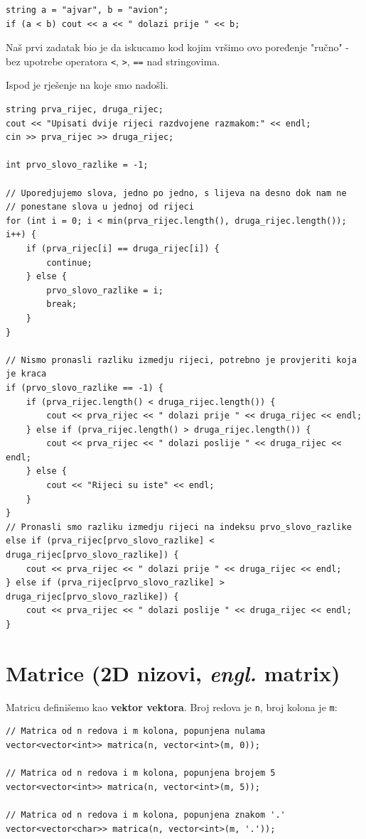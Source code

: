 \documentclass[11pt]{article}
\begin{document}
\begin{lstlisting}
string a = "ajvar", b = "avion";
if (a < b) cout << a << " dolazi prije " << b;
\end{lstlisting}

Naš prvi zadatak bio je da iskucamo kod kojim vršimo ovo poređenje "ručno" - bez upotrebe 
operatora \texttt{<}, \texttt{>}, \texttt{==} nad stringovima.

Ispod je rješenje na koje smo nadošli.

\begin{lstlisting}
string prva_rijec, druga_rijec;
cout << "Upisati dvije rijeci razdvojene razmakom:" << endl;
cin >> prva_rijec >> druga_rijec;

int prvo_slovo_razlike = -1;

// Uporedjujemo slova, jedno po jedno, s lijeva na desno dok nam ne 
// ponestane slova u jednoj od rijeci
for (int i = 0; i < min(prva_rijec.length(), druga_rijec.length()); i++) {
    if (prva_rijec[i] == druga_rijec[i]) {
        continue;
    } else {
        prvo_slovo_razlike = i;
        break;
    }
}

// Nismo pronasli razliku izmedju rijeci, potrebno je provjeriti koja je kraca
if (prvo_slovo_razlike == -1) {
    if (prva_rijec.length() < druga_rijec.length()) {
        cout << prva_rijec << " dolazi prije " << druga_rijec << endl;
    } else if (prva_rijec.length() > druga_rijec.length()) {
        cout << prva_rijec << " dolazi poslije " << druga_rijec << endl;
    } else {
        cout << "Rijeci su iste" << endl;
    }
} 
// Pronasli smo razliku izmedju rijeci na indeksu prvo_slovo_razlike
else if (prva_rijec[prvo_slovo_razlike] < druga_rijec[prvo_slovo_razlike]) {
    cout << prva_rijec << " dolazi prije " << druga_rijec << endl;
} else if (prva_rijec[prvo_slovo_razlike] > druga_rijec[prvo_slovo_razlike]) {
    cout << prva_rijec << " dolazi poslije " << druga_rijec << endl;
}
\end{lstlisting}

\newpage

\section*{Matrice (2D nizovi, \textit{engl.} matrix)}

Matricu definišemo kao \textbf{vektor vektora}. Broj redova je \texttt{n},
broj kolona je \texttt{m}:

\begin{lstlisting}
// Matrica od n redova i m kolona, popunjena nulama
vector<vector<int>> matrica(n, vector<int>(m, 0));

// Matrica od n redova i m kolona, popunjena brojem 5
vector<vector<int>> matrica(n, vector<int>(m, 5));

// Matrica od n redova i m kolona, popunjena znakom '.'
vector<vector<char>> matrica(n, vector<int>(m, '.'));
\end{lstlisting}
\end{document}
